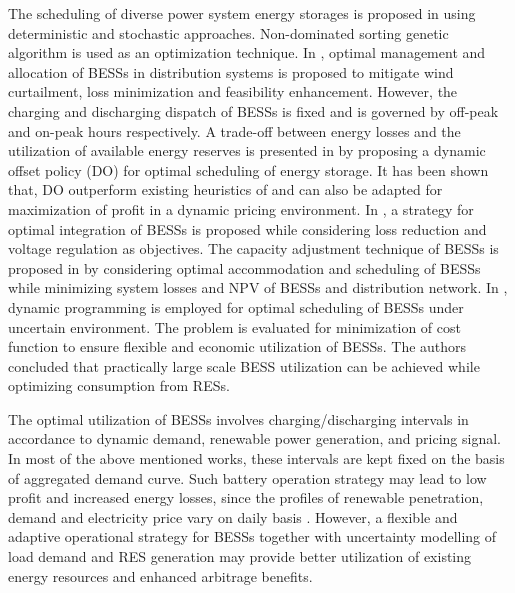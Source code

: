 \documentclass[journal]{IEEEtran}
\begin{document}
The scheduling of diverse power system energy storages is proposed in \cite{1519727} using deterministic and stochastic approaches. Non-dominated sorting genetic algorithm is used as an optimization technique.  In \cite{5438853}, optimal management and allocation of BESSs in distribution systems is proposed to mitigate wind curtailment, loss minimization and feasibility enhancement. However, the charging and discharging dispatch of BESSs is fixed and is governed by off-peak and on-peak hours respectively. A trade-off between energy losses and the utilization of available energy reserves is presented in \cite{6797967} by proposing a dynamic offset policy (DO) for optimal scheduling of energy storage. It has been shown that, DO outperform existing heuristics of \cite{6310769} and can also be adapted for maximization of profit in a dynamic pricing environment. In \cite{7321810}, a strategy for optimal integration of BESSs is proposed while considering loss reduction and voltage regulation as objectives. The capacity adjustment technique of BESSs is proposed in \cite{7422915} by considering optimal accommodation and scheduling of BESSs while minimizing system losses and NPV of BESSs and distribution network. In \cite{Hannah:2011:ADP:3104482.3104525,7973220,7741131}, dynamic programming is employed for optimal scheduling of BESSs under uncertain environment. The problem is evaluated for minimization of cost function to ensure flexible and economic utilization of BESSs. The authors concluded that practically large scale BESS utilization can be achieved while optimizing consumption from RESs.
\par The optimal utilization of BESSs involves charging/discharging intervals in accordance to dynamic demand, renewable power generation, and pricing signal. In most of the above mentioned works, these intervals are kept fixed on the basis of aggregated demand curve. Such battery operation strategy may lead to low profit and increased energy losses, since the profiles of renewable penetration, demand and electricity price vary on daily basis \cite{6387346}. However, a flexible and adaptive operational strategy for BESSs together with uncertainty modelling of load demand and RES generation may provide better utilization of existing energy resources and enhanced arbitrage benefits.
\end{document}
